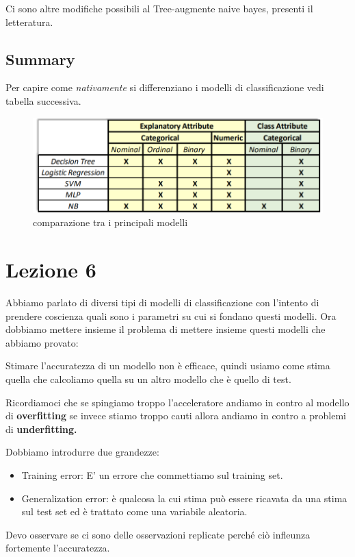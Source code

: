 \documentclass[12pt, a4paper,titlepage,openany]{article}
\begin{document}
Ci sono altre modifiche possibili al Tree-augmente naive bayes, presenti il letteratura. 
\clearpage
\subsection{Summary}
Per capire come \textit{nativamente} si differenziano i modelli di classificazione vedi tabella successiva. 

\begin{figure}[h!]
	\centering
	\includegraphics[height=0.3 \linewidth]{pict/class_tecniques.png}
	\caption{comparazione tra i principali modelli}
\end{figure}

\section{Lezione 6}

Abbiamo parlato di diversi tipi di modelli di classificazione con l'intento di prendere coscienza quali sono i parametri su cui si fondano questi modelli.
Ora dobbiamo mettere insieme il problema di mettere insieme questi modelli che abbiamo provato:

Stimare l'accuratezza di un modello non è efficace, quindi usiamo come stima quella che calcoliamo quella su un altro modello che è quello di test.

Ricordiamoci che se spingiamo troppo l'acceleratore andiamo in contro al modello di \textbf{overfitting} se invece stiamo troppo cauti allora andiamo in contro a problemi di \textbf{underfitting.}

Dobbiamo introdurre due grandezze:
\begin{itemize}
	\item Training error: E' un errore che commettiamo sul training set.
	\item Generalization error: è qualcosa la cui stima può essere ricavata da una stima sul test set ed è trattato come una variabile aleatoria.
\end{itemize}

Devo osservare se ci sono delle osservazioni replicate perché ciò infleunza fortemente l'accuratezza.
\end{document}
